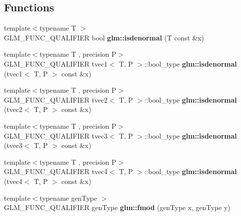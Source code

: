 \subsection*{Functions}
\begin{DoxyCompactItemize}
\item 
\mbox{\label{common_8inl_ae1eb587972c0a1c492f6c7026e34ca4f}} 
{\footnotesize template$<$typename T $>$ }\\G\+L\+M\+\_\+\+F\+U\+N\+C\+\_\+\+Q\+U\+A\+L\+I\+F\+I\+ER bool {\bfseries glm\+::isdenormal} (T const \&x)
\item 
\mbox{\label{common_8inl_aa92fc157ce32f36f5046a1fe9cbf06a6}} 
{\footnotesize template$<$typename T , precision P$>$ }\\G\+L\+M\+\_\+\+F\+U\+N\+C\+\_\+\+Q\+U\+A\+L\+I\+F\+I\+ER tvec1$<$ T, P $>$\+::bool\+\_\+type {\bfseries glm\+::isdenormal} (tvec1$<$ T, P $>$ const \&x)
\item 
\mbox{\label{common_8inl_ac32f35a22d48d844fdb5818a969a813e}} 
{\footnotesize template$<$typename T , precision P$>$ }\\G\+L\+M\+\_\+\+F\+U\+N\+C\+\_\+\+Q\+U\+A\+L\+I\+F\+I\+ER tvec2$<$ T, P $>$\+::bool\+\_\+type {\bfseries glm\+::isdenormal} (tvec2$<$ T, P $>$ const \&x)
\item 
\mbox{\label{common_8inl_adbc1b50d093dfcbd800c1d317f798599}} 
{\footnotesize template$<$typename T , precision P$>$ }\\G\+L\+M\+\_\+\+F\+U\+N\+C\+\_\+\+Q\+U\+A\+L\+I\+F\+I\+ER tvec3$<$ T, P $>$\+::bool\+\_\+type {\bfseries glm\+::isdenormal} (tvec3$<$ T, P $>$ const \&x)
\item 
\mbox{\label{common_8inl_a0807268548a810387d609bdd544ed7e9}} 
{\footnotesize template$<$typename T , precision P$>$ }\\G\+L\+M\+\_\+\+F\+U\+N\+C\+\_\+\+Q\+U\+A\+L\+I\+F\+I\+ER tvec4$<$ T, P $>$\+::bool\+\_\+type {\bfseries glm\+::isdenormal} (tvec4$<$ T, P $>$ const \&x)
\item 
\mbox{\label{common_8inl_a823bda2877e4dcc4440987f94e0e3690}} 
{\footnotesize template$<$typename gen\+Type $>$ }\\G\+L\+M\+\_\+\+F\+U\+N\+C\+\_\+\+Q\+U\+A\+L\+I\+F\+I\+ER gen\+Type {\bfseries glm\+::fmod} (gen\+Type x, gen\+Type y)

\end{DoxyCompactItemize}
